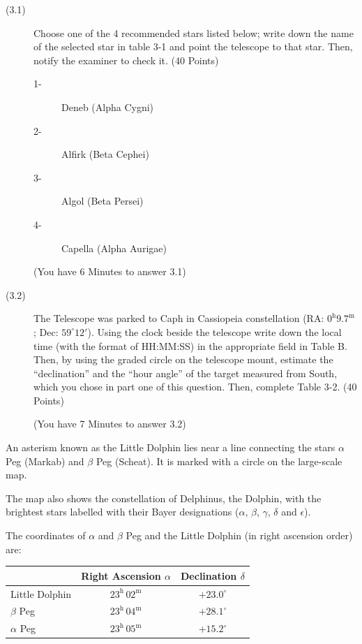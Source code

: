 \begin{description}
\item[(3.1)] Choose one of the 4 recommended stars listed below; write down
  the name of the selected star in table 3-1 and point the telescope to that
  star. Then, notify the examiner to check it. \hfill(40 Points)
  \begin{description}
  \item[1-] Deneb (Alpha Cygni)
  \item[2-] Alfirk (Beta Cephei)
  \item[3-] Algol (Beta Persei)
  \item[4-] Capella (Alpha Aurigae)
  \end{description}
  (You have 6 Minutes to answer 3.1)
\item[(3.2)] The Telescope was parked to Caph in Cassiopeia constellation
  (RA: $0^{\mathrm{h}}9.7^{\mathrm{m}}$; Dec: $59^\circ 12'$). Using the
  clock beside the telescope write down the local time (with the format of
  HH:MM:SS) in the appropriate field in Table B. Then, by using the graded
  circle on the telescope mount, estimate the ``declination'' and the ``hour
  angle'' of the target measured from South, which you chose in part one of
  this question. Then, complete Table 3-2. \hfill(40 Points)

  (You have 7 Minutes to answer 3.2)
\end{description}

An asterism known as the Little Dolphin lies near a line connecting the stars
$\alpha$ Peg (Markab) and $\beta$ Peg (Scheat). It is marked with a circle on
the large-scale map.

The map also shows the constellation of Delphinus, the Dolphin, with the
brightest stars labelled with their Bayer designations ($\alpha$, $\beta$,
$\gamma$, $\delta$ and $\epsilon$).


The coordinates of $\alpha$ and $\beta$ Peg and the Little Dolphin (in right
ascension order) are:

\begin{center}
\begin{tabular}{lcc}
 & Right Ascension $\alpha$ & Declination $\delta$ \\
\hline
Little Dolphin & $23^{\mathrm{h}}\,02^{\mathrm{m}}$ & $+23.0^\circ$ \\
$\beta$ Peg & $23^{\mathrm{h}}\,04^{\mathrm{m}}$ & $+28.1^\circ$ \\
$\alpha$ Peg & $23^{\mathrm{h}}\,05^{\mathrm{m}}$ & $+15.2^\circ$ \\
\end{tabular}
\end{center}

